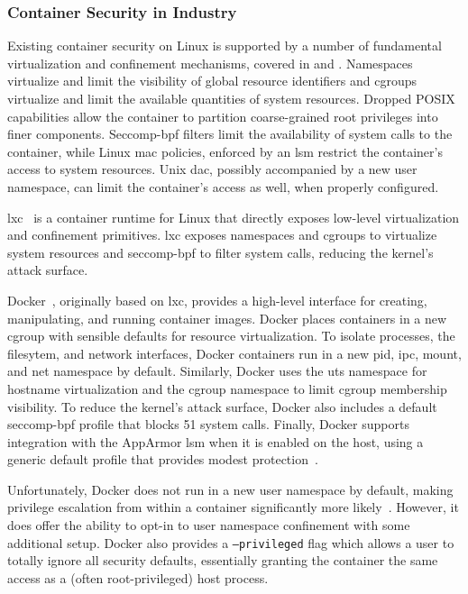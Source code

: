 \documentclass[
  fontsize=12pt,
  titlepage=firstiscover,
  paper=letter,
oneside,
  cleardoublepage=plain,
  parskip=half-,
  DIV=10,
  parindent,
  appendixprefix,
  chapterprefix,
  listof=totoc,
]{scrbook}
\begin{document}
\subsubsection{Container Security in Industry}\label{sss:container-security-industry}

Existing container security on Linux is supported by a number of fundamental
virtualization and confinement mechanisms, covered in  and
. Namespaces virtualize and limit the visibility of global
resource identifiers and cgroups virtualize and limit the available quantities of system
resources. Dropped POSIX capabilities allow the container to partition coarse-grained root
privileges into finer components. Seccomp-bpf filters limit the availability of system
calls to the container, while Linux \gls{mac} policies, enforced by an \gls{lsm} restrict
the container's access to system resources. Unix \gls{dac}, possibly accompanied by a new
user namespace, can limit the container's access as well, when properly configured.

\gls{lxc}~\cite{lxc_security} is a container runtime for Linux that directly exposes
low-level virtualization and confinement primitives. \gls{lxc} exposes namespaces and
cgroups to virtualize system resources and seccomp-bpf to filter system calls, reducing
the kernel's attack surface.

Docker~\cite{docker_security, bui2015_docker_analysis, combe2016_to_docker}, originally
based on \gls{lxc}, provides a high-level interface for creating, manipulating, and
running container images. Docker places containers in a new cgroup with sensible defaults
for resource virtualization. To isolate processes, the filesytem, and network interfaces,
Docker containers run in a new \gls{pid}, \gls{ipc}, mount, and net
namespace by default.  Similarly, Docker uses the \gls{uts} namespace for hostname
virtualization and the cgroup namespace to limit cgroup membership visibility. To
reduce the kernel's attack surface, Docker also includes a default seccomp-bpf profile
that blocks 51 system calls. Finally, Docker supports integration with the AppArmor
\gls{lsm} when it is enabled on the host, using a generic default profile that provides
modest protection~\cite{docker_apparmor, docker_default_apparmor}.

Unfortunately, Docker does not run in a new user namespace by default, making privilege
escalation from within a container significantly more likely~\cite{docker_security}.
However, it does offer the ability to opt-in to user namespace confinement with some
additional setup.  Docker also provides a \texttt{--privileged} flag which allows a user
to totally ignore all security defaults, essentially granting the container the same
access as a (often root-privileged) host process.
\end{document}

